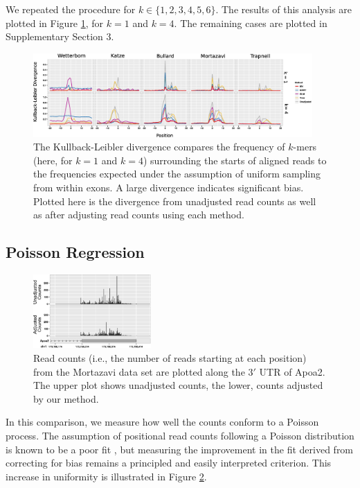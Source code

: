 \documentclass{bioinfo}
\begin{document}
We repeated the procedure for $k \in \{1, 2, 3, 4, 5, 6\}$. The results of this
analysis are plotted in Figure \ref{fig:kl}, for $k = 1$ and $k = 4$. The
remaining cases are plotted in Supplementary Section 3.

\begin{figure}
\centerline{\includegraphics[width=0.95\textwidth]{kl.eps}}
\caption{The Kullback-Leibler divergence compares the frequency of $k$-mers
(here, for $k = 1$ and $k = 4$) surrounding the starts of aligned reads to the
frequencies expected under the assumption of uniform sampling from within exons.
A large divergence indicates significant bias. Plotted here is the divergence
from unadjusted read counts as well as after adjusting read counts using each
method.}
\label{fig:kl}
\end{figure}


\subsection{Poisson Regression}

\begin{figure}
\centerline{\includegraphics[width=0.4\textwidth]{uniformity.eps}}
\caption{Read counts (i.e., the number of reads starting at each position)
from the Mortazavi data set are plotted along the $3'$ UTR of Apoa2. The upper
plot shows unadjusted counts, the lower, counts adjusted by our method.}
\label{fig:unif}
\end{figure}

In this comparison, we measure how well the counts conform to a Poisson process.
The assumption of positional read counts following a Poisson distribution is
known to be a poor fit \citep{Srivastava2010}, but measuring the improvement in
the fit derived from correcting for bias remains a principled and easily
interpreted criterion. This increase in uniformity is illustrated in Figure
\ref{fig:unif}.
\end{document}
